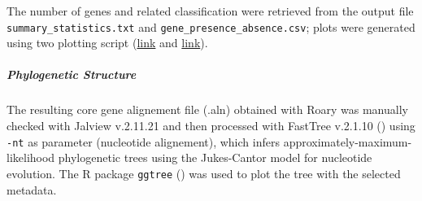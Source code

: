 The number of genes and related classification were retrieved from the output file
\texttt{summary\_statistics.txt} and \texttt{gene\_presence\_absence.csv}; plots were generated using two
plotting script (\href{https://github.com/sanger-pathogens/Roary/blob/master/bin/create_pan_genome_plots.R}{link}
and \href{https://github.com/sanger-pathogens/Roary/blob/master/contrib/roary_plots/roary_plots.py}{link}).


\subparagraph*{Phylogenetic Structure}

The resulting core gene alignement file (.aln) obtained with Roary was manually checked with
Jalview v.2.11.21 and then processed with FastTree v.2.1.10 (\cite{fasttree})
using \texttt{-nt} as parameter (nucleotide alignement), which infers approximately-maximum-likelihood phylogenetic trees using the Jukes-Cantor model for nucleotide evolution.
The R package \texttt{ggtree} (\cite{ggtree1, ggtree2, ggtree3}) was used to plot
the tree with the selected metadata.





